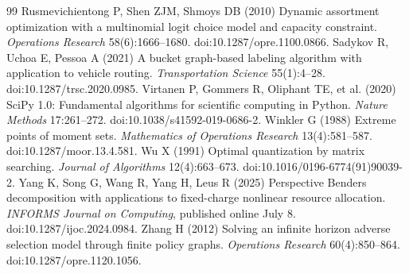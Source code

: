 \documentclass[11pt,letterpaper]{article}
\theoremstyle{definition}\newtheorem{remark}[theorem]{Remark}
\begin{document}
\begin{thebibliography}{99}
Rusmevichientong P, Shen ZJM, Shmoys DB (2010) Dynamic assortment optimization with a multinomial logit choice model and capacity constraint. \emph{Operations Research} 58(6):1666--1680. doi:10.1287/opre.1100.0866.
Sadykov R, Uchoa E, Pessoa A (2021) A bucket graph-based labeling algorithm with application to vehicle routing. \emph{Transportation Science} 55(1):4--28. doi:10.1287/trsc.2020.0985.
Virtanen P, Gommers R, Oliphant TE, et al. (2020) SciPy 1.0: Fundamental algorithms for scientific computing in Python. \emph{Nature Methods} 17:261--272. doi:10.1038/s41592-019-0686-2.
Winkler G (1988) Extreme points of moment sets. \emph{Mathematics of Operations Research} 13(4):581--587. doi:10.1287/moor.13.4.581.
Wu X (1991) Optimal quantization by matrix searching. \emph{Journal of Algorithms} 12(4):663--673. doi:10.1016/0196-6774(91)90039-2.
Yang K, Song G, Wang R, Yang H, Leus R (2025) Perspective Benders decomposition with applications to fixed-charge nonlinear resource allocation. \emph{INFORMS Journal on Computing}, published online July 8. doi:10.1287/ijoc.2024.0984.
Zhang H (2012) Solving an infinite horizon adverse selection model through finite policy graphs. \emph{Operations Research} 60(4):850--864. doi:10.1287/opre.1120.1056.


\end{thebibliography}
\label{refs-end}\clearpage
\end{document}
